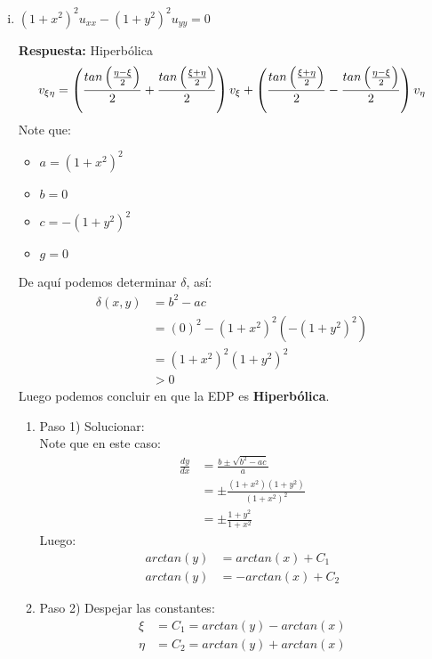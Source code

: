 \begin{homeworkProblem}
\begin{enumerate}[(i)]
\begin{solucion}
\begin{enumerate}
    \end{enumerate}
\end{solucion}
    \item $(1+x^{2})^{2}u_{xx}-(1+y^2)^2u_{yy}=0$ 
\begin{solucion}
    \textbf{Respuesta:} Hiperbólica\\
    $$v_{\xi\eta}=\left( \frac{tan\left( \frac{\eta-\xi}{2} \right)}{2}+\frac{tan\left( \frac{\xi+\eta}{2} \right)}{2} \right)v_{\xi}+\left( \frac{tan\left( \frac{\xi+\eta}{2} \right)}{2}-\frac{tan\left( \frac{\eta-\xi}{2} \right)}{2} \right)v_{\eta}$$
    Note que:
    \begin{itemize}
        \item $a=(1+x^2)^2$
        \item $b=0$
        \item $c=-(1+y^2)^2$
        \item $g=0$
    \end{itemize}
    De aquí podemos determinar $\delta$, así:
    \begin{align*}
        \delta(x,y)&=b^2-ac\\
        &=(0)^2-(1+x^2)^2(-(1+y^2)^2)\\
        &=(1+x^2)^2(1+y^2)^2\\
        &>0
    \end{align*}
    Luego podemos concluir en que la EDP es \textbf{Hiperbólica}.
    \begin{enumerate}
        \item Paso 1) Solucionar:\\
        Note que en este caso:
        \begin{align*}
            \frac{dy}{dx}&=\frac{b \pm \sqrt{b^{2}-ac}}{a}\\
            &=\pm\frac{ (1+x^2)(1+y^2)}{(1+x^2)^2}\\
            &=\pm\frac{1+y^2}{1+x^2}
        \end{align*}
        Luego:
        \begin{align*}
            arctan(y)&=arctan(x)+C_1\\
            arctan(y)&=-arctan(x)+C_2
        \end{align*}
        \item Paso 2) Despejar las constantes:\\
        \begin{align*}
            \xi&=C_1=arctan(y)-arctan(x)\\
            \eta&=C_2=arctan(y)+arctan(x)
        \end{align*}

\end{enumerate}
\end{solucion}
\end{enumerate}
\end{homeworkProblem}
